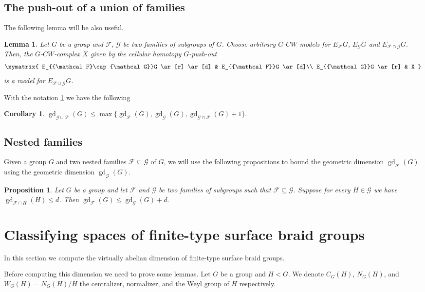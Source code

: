 \documentclass[a4paper,12pt,leqno]{amsart}
\newtheorem{proposition}[theorem]{Proposition}
\newtheorem{corollary}[theorem]{Corollary}
\newtheorem{lemma}[theorem]{Lemma}
\theoremstyle{definition}
\newcommand{\calF}{{\mathcal F}}
\newcommand{\calG}{{\mathcal G}}
\DeclareMathOperator{\gd}{gd}
\begin{document}
\subsection*{The push-out of a union of families}
 The following lemma will be also useful.
\begin{lemma}\cite[Lemma~4.4]{DQR11}\label{lemma:union:families}
Let $G$ be a group and $\calF,\, \calG$ be two families of subgroups of $G$.  Choose arbitrary $G$-$CW$-models for $E_{\calF} G$, $E_{\calG}G$ and $E_{\calF\cap\calG} G$. Then, the $G$-$CW$-complex $X$ given by the cellular homotopy $G$-push-out
\[
\xymatrix{
E_{\calF\cap\calG}G \ar[r] \ar[d] & E_{\calF}G \ar[d]\\
E_{\calG}G \ar[r] & X
}
\]
is a model for $E_{\calF\cup\calG}G$.
\end{lemma}
With the notation \cref{lemma:union:families} we have the following
\begin{corollary}\label{upper:bound:gd:two:families}
  $\gd_{\calG\cup\calF}(G)\leq\max\{\gd_{\calF}(G), \gd_{\calG}(G), \gd_{\calG\cap\calF}(G)+1\}.$  
\end{corollary}
\subsection*{Nested families}

Given a group $G$ and two nested families $\calF\subseteq \calG$ of $G$, we will use the following propositions to bound the geometric dimension $\gd_{\calF}(G)$ using the geometric dimension $\gd_{\calG}(G)$.

\begin{proposition}\cite[Proposition 5.1 (i)]{LW12}\label{nested:families:lw}
 Let $G$ be a group and let $\calF$ and $\calG$ be
two families of subgroups such that $\calF\subseteq \calG$. Suppose for every $H\in \calG$ we have $\gd_{\calF\cap H}(H)\leq d$. Then $\gd_{\calF}(G)\leq \gd_{\calG}(G)+d.$
\end{proposition}
\section{Classifying spaces of finite-type surface braid groups}\label{virt:abelian:dimension:surface:braid:groups}

In this section we compute the virtually abelian dimension of finite-type surface braid groups.

Before computing this dimension we need to prove some lemmas.
Let $G$ be a group and $H<G$. We denote $C_G(H)$, $N_G(H)$, and $W_G(H)=N_G(H)/H$  the centralizer, normalizer, and the Weyl group of $H$ respectively. 
\end{document}
